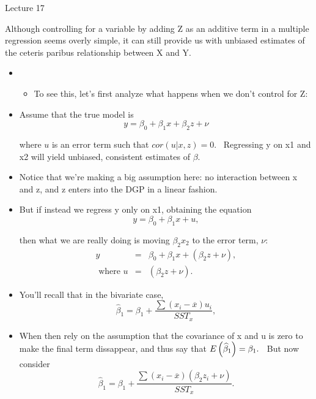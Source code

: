 \documentclass[11pt]{article}
\begin{document}
Lecture 17

Although controlling for a variable by adding Z as an additive term in a
multiple regression seems overly simple, it can still provide us with
unbiased estimates of the ceteris paribus relationship between X and Y.

\begin{itemize}
\item 
\begin{itemize}
\item To see this, let's first analyze what happens when we don't control
for Z:
\end{itemize}

\item Assume that the true model is%
\begin{equation*}
y=\beta _{0}+\beta _{1}x+\beta _{2}z+\nu
\end{equation*}

where $u$ is an error term such that $cor\left( u|x,z\right) =0$. \
Regressing y on x1 and x2 will yield unbiased, consistent estimates of $%
\beta .$

\item Notice that we're making a big assumption here: no interaction between
x and z, and z enters into the DGP in a linear fashion.

\item But if instead we regress y only on x1, obtaining the equation 
\begin{equation*}
y=\beta _{0}+\beta _{1}x+u,
\end{equation*}

then what we are really doing is moving $\beta _{2}x_{2}$ to the error term, 
$\nu :$%
\begin{eqnarray*}
y &=&\beta _{0}+\beta _{1}x+(\beta _{2}z+\nu )\mathbf{,} \\
\text{ where }u &=&(\beta _{2}z+\nu ).
\end{eqnarray*}

\item You'll recall that in the bivariate case, 
\begin{equation*}
\widehat{\beta }_{1}=\beta _{1}+\frac{\sum \left( x_{i}-\overline{x}\right)
u_{i}}{SST_{x}},
\end{equation*}

\item When then rely on the assumption that the covariance of x and u is
zero to make the final term dissappear, and thus say that $E\left( \widehat{%
\beta }_{1}\right) =\beta _{1}.$ \ But now consider%
\begin{equation*}
\widehat{\beta }_{1}=\beta _{1}+\frac{\sum \left( x_{i}-\overline{x}\right)
\left( \beta _{2}z_{i}+\nu \right) }{SST_{x}}.
\end{equation*}


\end{itemize}
\end{document}
